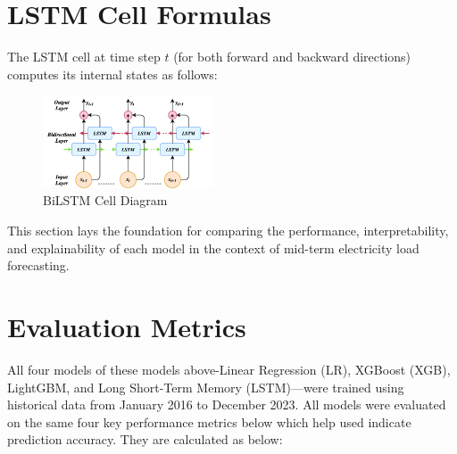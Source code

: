 \documentclass[final,numbered]{ifacconf}
\begin{document}
\section*{LSTM Cell Formulas}

The LSTM cell at time step $t$ (for both forward and backward directions) computes its internal states as follows:
\begin{figure}[h]
  \centering
  \includegraphics[width=0.45\textwidth]{bidrectionallstm.png}
  \caption{BiLSTM Cell Diagram}
  \label{fig:bilstm}
\end{figure}

This section lays the foundation for comparing the performance, interpretability, and explainability of each model in the context of mid-term electricity load forecasting.



\section{Evaluation Metrics}

All four models of these models above-Linear Regression (LR), XGBoost (XGB), LightGBM, and Long Short-Term Memory (LSTM)—were trained using historical data from January 2016 to December 2023. All models were evaluated on the same four key performance metrics below which help used indicate prediction accuracy. They are calculated as below:
\end{document}
